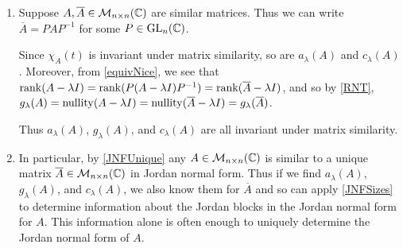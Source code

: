 \documentclass[../main.tex]{subfiles}
\begin{document}
\begin{remark}
  \begin{enumerate}
    \item Suppose $A, \overline{A} \in \mathcal{M}_{n \times n}(\mathbb{C})$ are similar matrices.
      Thus we can write $\overline{A} = PAP^{-1}$ for some $P \in \mathrm{GL}_n(\mathbb{C})$.

      Since $\chi_A(t)$ is invariant under matrix similarity, so are $a_{\lambda}(A)$ and $c_{\lambda}(A)$.
      Moreover, from \cref{equivNice}, we see that $\operatorname{rank}(A - \lambda I) = \operatorname{rank}(P(A - \lambda I)P^{-1}) = \operatorname{rank}(\overline{A} - \lambda I)$, and so by \cref{RNT}, $g_{\lambda}(A) = \operatorname{nullity}(A - \lambda I) = \operatorname{nullity}(\overline{A} - \lambda I) = g_{\lambda}(\overline{A})$.

      Thus $a_{\lambda}(A)$, $g_{\lambda}(A)$, and $c_{\lambda}(A)$ are all invariant under matrix similarity.
    \item In particular, by \cref{JNFUnique} any $A \in \mathcal{M}_{n \times n}(\mathbb{C})$ is similar to a unique matrix $\overline{A} \in \mathcal{M}_{n \times n}(\mathbb{C})$ in Jordan normal form.
      Thus if we find $a_{\lambda}(A)$, $g_{\lambda}(A)$, and $c_{\lambda}(A)$, we also know them for $\overline{A}$ and so can apply \cref{JNFSizes} to determine information about the Jordan blocks in the Jordan normal form for $A$.
      This information alone is often enough to uniquely determine the Jordan normal form of $A$.
  \end{enumerate}
\end{remark}
\end{document}
